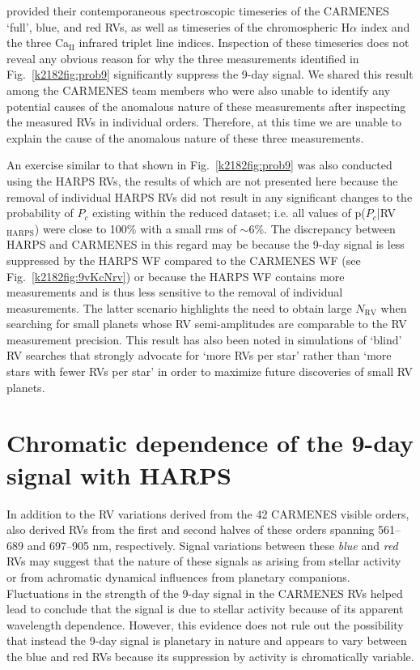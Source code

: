 provided their contemporaneous spectroscopic timeseries of the CARMENES `full', 
blue, and red RVs, as well as timeseries of the chromospheric  H$\alpha$ index and the three Ca$_{\text{II}}$ infrared
triplet line indices. Inspection of these timeseries does not reveal any obvious reason for why the three
measurements identified in Fig.~\ref{k2182fig:prob9} significantly suppress the 9-day signal.
We shared this result among the CARMENES team
members who were also unable to identify any potential causes of the anomalous nature of these measurements
after inspecting the measured RVs in individual orders. Therefore, at this time we are unable to explain
the cause of the anomalous nature of these three measurements.

An exercise similar to that  shown in Fig.~\ref{k2182fig:prob9} was also conducted using the HARPS RVs,  the results of which
are not presented here because the removal of individual HARPS RVs did not result
in any significant changes to the probability of $P_c$ existing within the reduced dataset; i.e. all values of
p($P_c$|RV$_{\text{HARPS}}$) were close to 100\% with a small rms of $\sim 6$\%.
The discrepancy between HARPS and CARMENES in this regard may be because the 9-day signal
is less suppressed by the HARPS WF compared to the CARMENES WF (see Fig.~\ref{k2182fig:9vKcNrv}) or because the HARPS
WF contains more measurements and is thus less sensitive to the removal of individual measurements. The latter
scenario highlights the need to obtain large $N_{\text{RV}}$ when searching for small planets whose RV
semi-amplitudes are comparable to the RV measurement precision. This result has also been noted in simulations of
`blind' RV searches \citep[e.g.][]{cloutier18} that strongly advocate for `more RVs per star' rather than `more stars
with fewer RVs per star' in order to maximize future discoveries of small RV planets.


\section{Chromatic dependence of the 9-day signal with HARPS} \label{k2182sect:act}
In addition to the RV variations derived from the 42 CARMENES visible orders,  also derived RVs from
the first and second halves of these orders spanning 561--689 and 697--905 nm, respectively. Signal variations between
these \emph{blue} and \emph{red} RVs may suggest that the nature of these signals as arising from stellar activity or
from achromatic dynamical influences from planetary companions. 
Fluctuations in the strength of the 9-day signal in the CARMENES RVs helped lead 
to conclude that the signal is due to stellar activity because of its apparent wavelength dependence. However, this
evidence does not rule out the possibility that instead the 9-day signal is planetary in nature and appears to vary
between the blue and red RVs because its suppression by activity is chromatically variable.

